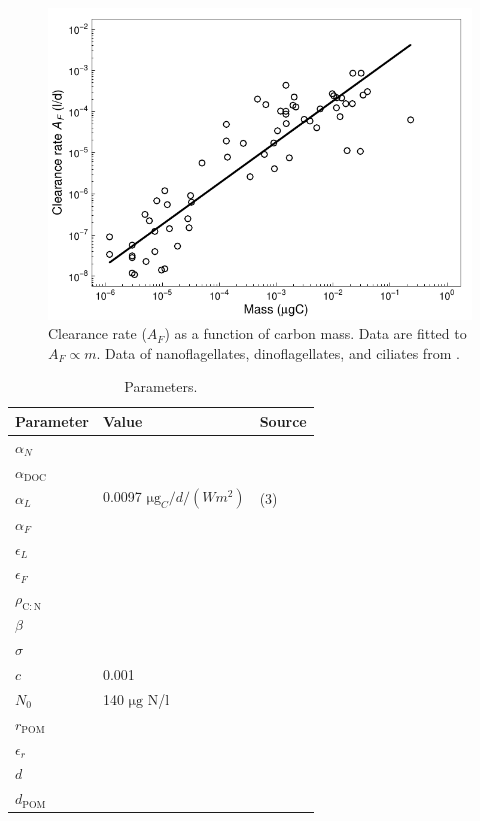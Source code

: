 \documentclass[11pt]{article}
\newcommand{\DOC}{\mathrm{DOC}}
\newcommand{\POM}{\mathrm{POM}}
\newcommand{\rCN}{\rho_\mathrm{C:N}}
\newcommand{\mug}{\mathrm{\mu g}}
\begin{document}
\begin{figure}[t]
  \centering
  \includegraphics{AF.pdf}
  \caption{Clearance rate ($A_F$) as a function of carbon mass. Data are fitted to $A_F \propto m$. Data of nanoflagellates, dinoflagellates, and ciliates from \citet{Kiorboe2014}.}
  \label{fig:AF}
\end{figure}


\begin{table}[t]
  \centering
  \caption{Parameters.}
  \begin{tabular}{lll}
    Parameter & Value & Source \\
    \hline
    $\alpha_N$\\
    $\alpha_\DOC$ \\
    $\alpha_L$ & 0.0097 $\mug_C/d/(Wm^2)$ & (3)\\
    $\alpha_F$ \\
    $\epsilon_L$ \\
    $\epsilon_F$ \\
    $\rCN$ \\
    $\beta$ \\
    $\sigma$ \\
    $c$ & 0.001 & \citet{Andersen2015} \\
    $N_0$ & 140 $\mug$ N/l & \\
    $r_\POM$ \\
    $\epsilon_r$ \\
    $d$ \\
    $d_\POM$ \\
    \hline
    \hline
  \end{tabular}
  \label{tab:parameters}
\end{table}
\end{document}
